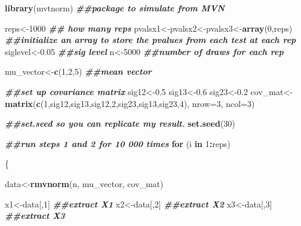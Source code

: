 \documentclass[
]{book}
\newenvironment{Shaded}{\begin{snugshade}}{\end{snugshade}}
\newcommand{\AttributeTok}[1]{\textcolor[rgb]{0.13,0.29,0.53}{#1}}
\newcommand{\ControlFlowTok}[1]{\textcolor[rgb]{0.13,0.29,0.53}{\textbf{#1}}}
\newcommand{\DecValTok}[1]{\textcolor[rgb]{0.00,0.00,0.81}{#1}}
\newcommand{\DocumentationTok}[1]{\textcolor[rgb]{0.56,0.35,0.01}{\textbf{\textit{#1}}}}
\newcommand{\FloatTok}[1]{\textcolor[rgb]{0.00,0.00,0.81}{#1}}
\newcommand{\FunctionTok}[1]{\textcolor[rgb]{0.13,0.29,0.53}{\textbf{#1}}}
\newcommand{\NormalTok}[1]{#1}
\newcommand{\OtherTok}[1]{\textcolor[rgb]{0.56,0.35,0.01}{#1}}
\newcommand{\SpecialCharTok}[1]{\textcolor[rgb]{0.81,0.36,0.00}{\textbf{#1}}}
\begin{document}
\begin{Shaded}
\begin{Highlighting}[]
\FunctionTok{library}\NormalTok{(mvtnorm) }\DocumentationTok{\#\#package to simulate from MVN}

\NormalTok{reps}\OtherTok{\textless{}{-}}\DecValTok{1000} \DocumentationTok{\#\# how many reps}
\NormalTok{pvalsx1}\OtherTok{\textless{}{-}}\NormalTok{pvalsx2}\OtherTok{\textless{}{-}}\NormalTok{pvalsx3}\OtherTok{\textless{}{-}}\FunctionTok{array}\NormalTok{(}\DecValTok{0}\NormalTok{,reps) }\DocumentationTok{\#\#initialize an array to store the pvalues from each test at each rep}
\NormalTok{siglevel}\OtherTok{\textless{}{-}}\FloatTok{0.05} \DocumentationTok{\#\#sig level}
\NormalTok{n}\OtherTok{\textless{}{-}}\DecValTok{5000} \DocumentationTok{\#\#number of draws for each rep}

\NormalTok{mu\_vector}\OtherTok{\textless{}{-}}\FunctionTok{c}\NormalTok{(}\DecValTok{1}\NormalTok{,}\DecValTok{2}\NormalTok{,}\DecValTok{5}\NormalTok{) }\DocumentationTok{\#\#mean vector}

\DocumentationTok{\#\#set up covariance matrix}
\NormalTok{sig12}\OtherTok{\textless{}{-}}\FloatTok{0.5}
\NormalTok{sig13}\OtherTok{\textless{}{-}}\FloatTok{0.6}
\NormalTok{sig23}\OtherTok{\textless{}{-}}\FloatTok{0.2}
\NormalTok{cov\_mat}\OtherTok{\textless{}{-}}\FunctionTok{matrix}\NormalTok{(}\FunctionTok{c}\NormalTok{(}\DecValTok{1}\NormalTok{,sig12,sig13,sig12,}\DecValTok{2}\NormalTok{,sig23,sig13,sig23,}\DecValTok{4}\NormalTok{), }\AttributeTok{nrow=}\DecValTok{3}\NormalTok{, }\AttributeTok{ncol=}\DecValTok{3}\NormalTok{)}

\DocumentationTok{\#\#set.seed so you can replicate my result.}
\FunctionTok{set.seed}\NormalTok{(}\DecValTok{30}\NormalTok{)}

\DocumentationTok{\#\#run steps 1 and 2 for 10 000 times}
\ControlFlowTok{for}\NormalTok{ (i }\ControlFlowTok{in} \DecValTok{1}\SpecialCharTok{:}\NormalTok{reps)}
  
\NormalTok{\{}

\NormalTok{  data}\OtherTok{\textless{}{-}}\FunctionTok{rmvnorm}\NormalTok{(n, mu\_vector, cov\_mat)}
  
\NormalTok{  x1}\OtherTok{\textless{}{-}}\NormalTok{data[,}\DecValTok{1}\NormalTok{] }\DocumentationTok{\#\#extract X1}
\NormalTok{  x2}\OtherTok{\textless{}{-}}\NormalTok{data[,}\DecValTok{2}\NormalTok{] }\DocumentationTok{\#\#extract X2}
\NormalTok{  x3}\OtherTok{\textless{}{-}}\NormalTok{data[,}\DecValTok{3}\NormalTok{] }\DocumentationTok{\#\#extract X3}
  

\end{Highlighting}
\end{Shaded}
\end{document}
